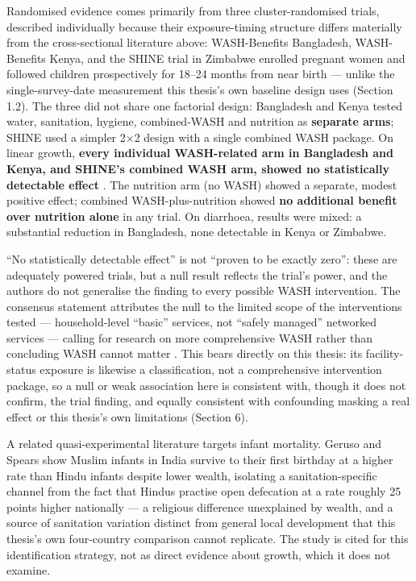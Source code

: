 Randomised evidence comes primarily from three cluster-randomised trials, described individually because their exposure-timing structure differs materially from the cross-sectional literature above: WASH-Benefits Bangladesh, WASH-Benefits Kenya, and the SHINE trial in Zimbabwe enrolled pregnant women and followed children prospectively for 18--24 months from near birth --- unlike the single-survey-date measurement this thesis's own baseline design uses (Section 1.2). The three did not share one factorial design: Bangladesh and Kenya tested water, sanitation, hygiene, combined-WASH and nutrition as \textbf{separate arms}; SHINE used a simpler 2×2 design with a single combined WASH package. On linear growth, \textbf{every individual WASH-related arm in Bangladesh and Kenya, and SHINE's combined WASH arm, showed no statistically detectable effect} \autocite{Cumming2019}. The nutrition arm (no WASH) showed a separate, modest positive effect; combined WASH-plus-nutrition showed \textbf{no additional benefit over nutrition alone} in any trial. On diarrhoea, results were mixed: a substantial reduction in Bangladesh, none detectable in Kenya or Zimbabwe.

``No statistically detectable effect'' is not ``proven to be exactly zero'': these are adequately powered trials, but a null result reflects the trial's power, and the authors do not generalise the finding to every possible WASH intervention. The consensus statement attributes the null to the limited scope of the interventions tested --- household-level ``basic'' services, not ``safely managed'' networked services --- calling for research on more comprehensive WASH rather than concluding WASH cannot matter \autocite{Cumming2019}. This bears directly on this thesis: its facility-status exposure is likewise a classification, not a comprehensive intervention package, so a null or weak association here is consistent with, though it does not confirm, the trial finding, and equally consistent with confounding masking a real effect or this thesis's own limitations (Section 6).

A related quasi-experimental literature targets infant mortality. Geruso and Spears \autocite*{GerusoSpears2015} show Muslim infants in India survive to their first birthday at a higher rate than Hindu infants despite lower wealth, isolating a sanitation-specific channel from the fact that Hindus practise open defecation at a rate roughly 25 points higher nationally --- a religious difference unexplained by wealth, and a source of sanitation variation distinct from general local development that this thesis's own four-country comparison cannot replicate. The study is cited for this identification strategy, not as direct evidence about growth, which it does not examine.

